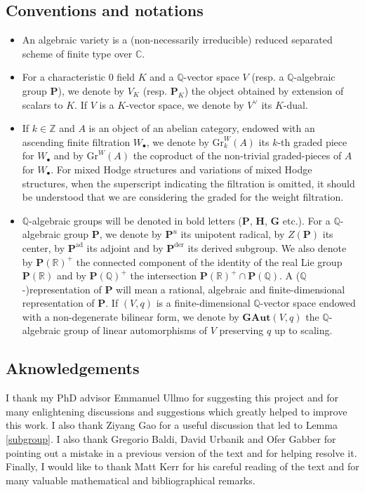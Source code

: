 \documentclass[10pt]{article}
\numberwithin{equation}{subsection}
\theoremstyle{plain}
\theoremstyle{definition}
\theoremstyle{remark}
\newcommand{\Z}{\mathbb Z}
\newcommand{\Q}{\mathbb Q}
\newcommand{\C}{\mathbb C}
\newcommand{\R}{\mathbb R}
\newcommand{\G}{\mathbf G}
\newcommand{\pp}{\mathbf P}
\newcommand{\mon}{\mathbf H}
\newcommand{\bul}{\bullet}
\newcommand{\gr}{\mathrm{Gr}}
\newcommand{\ad}{\mathrm{ad}}
\newcommand{\der}{\mathrm{der}}
\begin{document}
\subsection*{Conventions and notations}
\begin{itemize}
\item An algebraic variety is a (non-necessarily irreducible) reduced separated scheme of finite type over $\C$.
\item For a characteristic $0$ field $K$ and a $\Q$-vector space $V$ (resp. a $\Q$-algebraic group $\pp$), we denote by $V_K$ (resp. $\pp_K$) the object obtained by extension of scalars to $K$. If $V$ is a $K$-vector space, we denote by $V^\vee$ its $K$-dual.
\item If $k \in \Z$ and $A$ is an object of an abelian category, endowed with an ascending finite filtration $W_\bul$, we denote by $\gr^W_k(A)$ its $k$-th graded piece for $W_\bul$ and by $\gr^W(A)$ the coproduct of the non-trivial graded-pieces of $A$ for $W_\bul$. For mixed Hodge structures and variations of mixed Hodge structures, when the superscript indicating the filtration is omitted, it should be understood that we are considering the graded for the weight filtration.
\item $\Q$-algebraic groups will be denoted in bold letters ($\pp$, $\mon$, $\G$ etc.). For a $\Q$-algebraic group $\pp$, we denote by $\pp^u$ its unipotent radical, by $Z(\pp)$ its center, by $\pp^\ad$ its adjoint and by $\pp^\der$ its derived subgroup. We also denote by $\pp(\R)^+$ the connected component of the identity of the real Lie group $\pp(\R)$ and by $\pp(\Q)^+$ the intersection $\pp(\R)^+ \cap \pp(\Q)$. A ($\Q$-)representation of $\pp$ will mean a rational, algebraic and finite-dimensional representation of $\pp$. If $(V,q)$ is a finite-dimensional $\Q$-vector space endowed with a non-degenerate bilinear form, we denote by $\mathbf{GAut}(V,q)$ the $\Q$-algebraic group of linear automorphisms of $V$ preserving $q$ up to scaling.
\end{itemize}
\subsection*{Aknowledgements}
I thank my PhD advisor Emmanuel Ullmo for suggesting this project and for many enlightening discussions and suggestions which greatly helped to improve this work. I also thank Ziyang Gao for a useful discussion that led to Lemma \ref{subgroup}. I also thank Gregorio Baldi, David Urbanik and Ofer Gabber for pointing out a mistake in a previous version of the text and for helping resolve it. Finally, I would like to thank Matt Kerr for his careful reading of the text and for many valuable mathematical and bibliographical remarks.
\end{document}
